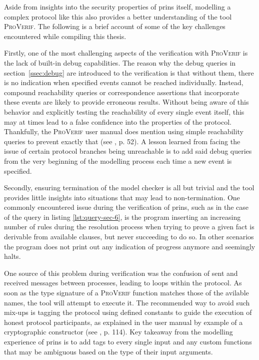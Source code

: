 Aside from insights into the security properties of \gls{prins} itself, modelling a complex protocol like this also provides a better understanding of the tool \textsc{ProVerif}.
The following is a brief account of some of the key challenges encountered while compiling this thesis.\medskip

Firstly, one of the most challenging aspects of the verification with \textsc{ProVerif} is the lack of built-in debug capabilities.
The reason why the debug queries in section~\ref{ssec:debug} are introduced to the verification is that without them, there is no indication when specified events cannot be reached individually.
Instead, compound reachability queries or correspondence assertions that incorporate these events are likely to provide erroneous results.
Without being aware of this behavior and explicitly testing the reachability of every single event itself, this may at times lead to a false confidence into the properties of the protocol.
Thankfully, the \textsc{ProVerif} user manual does mention using simple reachability queries to prevent exactly that (see \cite{blanchet2020proverif}, p. 52).
A lesson learned from facing the issue of certain protocol branches being unreachable is to add said debug queries from the very beginning of the modelling process each time a new event is specified.\medskip

Secondly, ensuring termination of the model checker is all but trivial and the tool provides little insights into situations that may lead to non-termination.
One commonly encountered issue during the verification of \gls{prins}, such as in the case of the query in listing \ref{lst:query-sec-6}, is the program inserting an increasing number of rules during the resolution process when trying to prove a given fact is derivable from available clauses, but never succeeding to do so.
In other scenarios the program does not print out any indication of progress anymore and seemingly halts.

One source of this problem during verification was the confusion of sent and received messages between processes, leading to loops within the protocol.
As soon as the type signature of a \textsc{ProVerif} function matches those of the avilable names, the tool will attempt to execute it.
The recommended way to avoid such mix-ups is tagging the protocol using defined constants to guide the execution of honest protocol participants, as explained in the user manual by example of a cryptographic constructor (see \cite{blanchet2020proverif}, p. 114).
Key takeaway from the modelling experience of \gls{prins} is to add tags to every single input and any custom functions that may be ambiguous based on the type of their input arguments.

